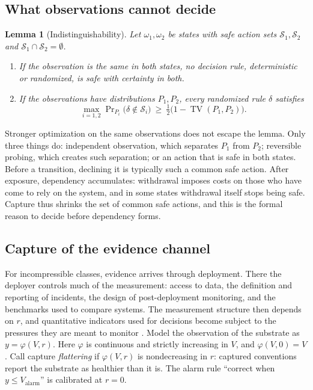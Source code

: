 \documentclass[11pt]{article}
\theoremstyle{plain}
\newtheorem{lemma}{Lemma}
\theoremstyle{definition}
\newcommand{\Valarm}{V_{\mathrm{alarm}}}
\newcommand{\TV}{\operatorname{TV}}
\begin{document}
\subsection{What observations cannot decide}

\begin{lemma}[Indistinguishability]\label{lem:indist}
Let $\omega_1,\omega_2$ be states with safe action sets $\mathcal{S}_1,\mathcal{S}_2$ and $\mathcal{S}_1\cap \mathcal{S}_2=\emptyset$.
\begin{enumerate}[label=(\roman*),leftmargin=*]
\item If the observation is the same in both states, no decision rule, deterministic or randomized, is safe with certainty in both.
\item If the observations have distributions $P_1,P_2$, every randomized rule $\delta$ satisfies
\[
\max_{i=1,2}\Pr\nolimits_{P_i}\big(\delta\notin \mathcal{S}_i\big)\ \ge\ \tfrac12\big(1-\TV(P_1,P_2)\big).
\]
\end{enumerate}
\end{lemma}

Stronger optimization on the same observations does not escape the lemma. Only three things do: independent observation, which separates $P_1$ from $P_2$; reversible probing, which creates such separation; or an action that is safe in both states. Before a transition, declining it is typically such a common safe action. After exposure, dependency accumulates: withdrawal imposes costs on those who have come to rely on the system, and in some states withdrawal itself stops being safe. Capture thus shrinks the set of common safe actions, and this is the formal reason to decide before dependency forms.

\subsection{Capture of the evidence channel}

For incompressible classes, evidence arrives through deployment. There the deployer controls much of the measurement: access to data, the definition and reporting of incidents, the design of post-deployment monitoring, and the benchmarks used to compare systems. The measurement structure then depends on $r$, and quantitative indicators used for decisions become subject to the pressures they are meant to monitor \citep{campbell1979}. Model the observation of the substrate as $y=\varphi(V,r)$. Here $\varphi$ is continuous and strictly increasing in $V$, and $\varphi(V,0)=V$. Call capture \emph{flattering} if $\varphi(V,r)$ is nondecreasing in $r$: captured conventions report the substrate as healthier than it is. The alarm rule ``correct when $y\le\Valarm$'' is calibrated at $r=0$.
\end{document}

